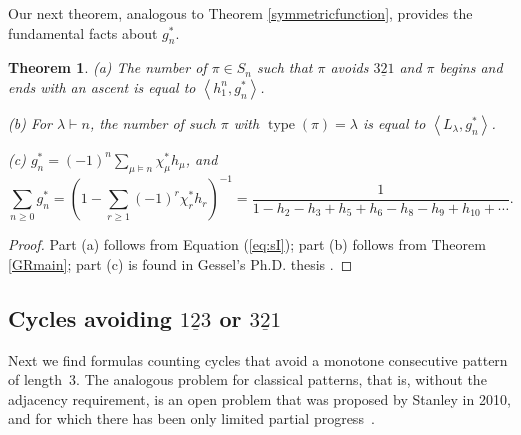 \documentclass[12pt]{article}
\newcommand{\Perm}{S}
\DeclareMathOperator{\type}{type}
\newcommand{\ee}{\chi}
\newtheorem{thm}{Theorem}[section]
\theoremstyle{definition}
\begin{document}
Our next theorem, analogous to Theorem \ref{symmetricfunction}, provides the fundamental facts about $g_n^*$.

\begin{thm} \label{symmetricfunction2} (a) The number of $\pi \in \Perm_n$ such that $\pi$ avoids $\underline{321}$ and $\pi$ begins and ends with an ascent is equal to $\left\langle h_1^n, g_n^* \right\rangle$.

(b) For $\lambda \vdash n$, the number of such $\pi$ with $\type(\pi) = \lambda$ is equal to $\left\langle L_\lambda, g_n^* \right\rangle$.

(c) $g_n^* = (-1)^n \sum_{\mu \vDash n} \ee_\mu^* h_\mu$, and
\[ \sum_{n\ge0} g_n^* = \left(1 - \sum_{r\ge1} (-1)^r \ee_r^* h_r\right)^{-1} = \frac{1}{1 - h_2 - h_3 + h_5 + h_6 - h_8 - h_9 + h_{10} + \cdots}. \]
\end{thm}
\begin{proof}
Part (a) follows from Equation (\ref{eq:sI}); part (b) follows from Theorem \ref{GRmain}; part (c) is found in Gessel's Ph.D. thesis \cite[Sec.\ 5.2, Example 4]{GesselThesis}.
\end{proof}


\subsection{Cycles avoiding $\underline{123}$ or $\underline{321}$}
\label{cyc123}

Next we find formulas counting cycles that avoid a monotone consecutive pattern of length~$3$. The analogous problem for classical patterns, that is, without the adjacency requirement, is an open problem that was proposed by Stanley in 2010, and for which there has been only limited partial progress~\cite{ArcEli,Elicont}.
\end{document}
